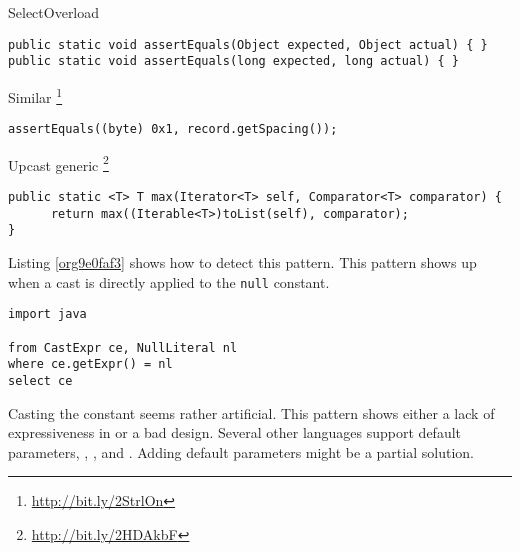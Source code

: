\begin{pattern}{SelectOverload}
\begin{verbatim}
public static void assertEquals(Object expected, Object actual) { }
public static void assertEquals(long expected, long actual) { }
\end{verbatim}

Similar 
\footnote{\url{http://bit.ly/2StrlOn}}

\begin{verbatim}
assertEquals((byte) 0x1, record.getSpacing());
\end{verbatim}

Upcast generic
\footnote{\url{http://bit.ly/2HDAkbF}}

\begin{verbatim}
public static <T> T max(Iterator<T> self, Comparator<T> comparator) {
      return max((Iterable<T>)toList(self), comparator);
}
\end{verbatim}

\detection{}
Listing \ref{org9e0faf3} shows how to detect this pattern.
This pattern shows up when a cast is directly applied to the \texttt{null} constant.

\begin{lstlisting}
import java

from CastExpr ce, NullLiteral nl
where ce.getExpr() = nl
select ce
\end{lstlisting}

\discussion{}
Casting the  constant seems rather artificial.
This pattern shows either a lack of expressiveness in \java{} or
a bad \api{} design.
Several other languages support default parameters, \eg{},
\scala{}, \csharp{} and \cpp{}.
Adding default parameters might be a partial solution.
\end{pattern}